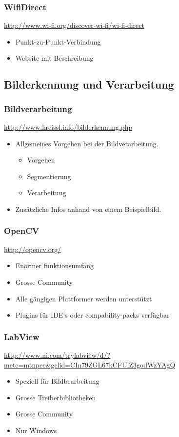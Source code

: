 \subsubsection{WifiDirect}
\url{http://www.wi-fi.org/discover-wi-fi/wi-fi-direct}
\begin{itemize}
    \item Punkt-zu-Punkt-Verbindung
    \item Website mit Beschreibung
\end{itemize}

\subsection{Bilderkennung und Verarbeitung}

\subsubsection{Bildverarbeitung}
\url{http://www.kreissl.info/bilderkennung.php}
\begin{itemize}
    \item Allgemeines Vorgehen bei der Bildverarbeitung. 
    \begin{itemize}
        \item Vorgehen
        \item Segmentierung
        \item Verarbeitung
    \end{itemize}
    \item Zusätzliche Infos anhand von einem Beispielbild.
\end{itemize}

\subsubsection{OpenCV}
\url{http://opencv.org/ }
\begin{itemize}
    \item Enormer funktionsumfang
    \item Grosse Community
    \item Alle gängigen Plattformer werden unterstützt
    \item Plugins für IDE’s oder compability-packs verfügbar
\end{itemize}

\subsubsection{LabView}
\url{http://www.ni.com/trylabview/d/?metc=mtnpee&gclid=CIn79ZGL67kCFUlZ3godWzYAgQ}
\begin{itemize}
    \item Speziell für Bildbearbeitung
    \item Grosse Treiberbibliotheken
    \item Grosse Community
    \item Nur Windows
\end{itemize}

